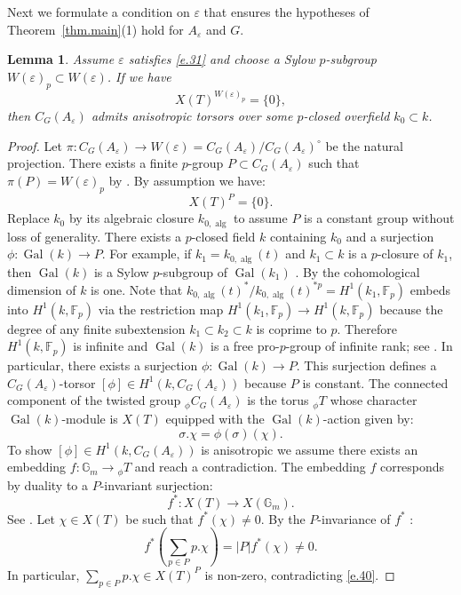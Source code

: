 \documentclass[12pt]{amsart}
\numberwithin{equation}{section}
\newtheorem{lemma}[theorem]{Lemma}
\theoremstyle{definition}
\newcommand{\bF}{\mathbb{F}}
\newcommand{\Gm}{\mathbb{G}_m}
\newcommand{\Gal}{\operatorname{Gal}}
\newcommand{\alg}{\operatorname{alg}}
\newcommand{\eps}{\varepsilon}
\begin{document}
Next we formulate a condition on $\eps$ that ensures the hypotheses of Theorem~\ref{thm.main}(1) hold for $A_\eps$ and $G$. 
\begin{lemma}\label{lem.C(Aeps)_admits_aniso}
    Assume $\eps$ satisfies \eqref{e.31} and choose a Sylow $p$-subgroup $W(\eps)_p\subset W(\eps)$. If we have \begin{equation}\label{e.32}
        X(T)^{W(\eps)_p} = \{0\},
        \end{equation} 
        then  $C_G(A_\eps)$ admits anisotropic torsors over some $p$-closed overfield $k_0\subset k$. 
\end{lemma}
\begin{proof}
    
Let $\pi: C_G(A_\eps) \to W(\eps) = C_G(A_\eps)/C_G(A_\eps)^\circ$ be the natural projection. There exists a finite  $p$-group $P\subset C_G(A_\eps)$ such that $\pi(P) = W(\eps)_p$ by \cite[Lemma 5.3]{lotscher2013essential2}. By assumption we have:
  \begin{equation}\label{e.40}
      X(T)^{P} = \{0\}.
  \end{equation}
    Replace $k_0$ by its algebraic closure $k_{0,\alg}$ to assume $P$ is a constant group without loss of generality.
  There exists a $p$-closed field $k$ containing $k_0$ and a surjection $\phi: \Gal(k) \to P$. For example, if $k_1 = k_{0,\alg}(t)$ and $k_1\subset k$ is a $p$-closure of $k_1$, then $\Gal(k)$ is a Sylow $p$-subgroup of $\Gal(k_1)$ \cite[Proposition
101.16]{ekm}. By \cite[Page 80, Example (b)]{serre1997galois} the cohomological dimension of $k$ is one. Note that $k_{0,\alg}(t)^*/k_{0,\alg}(t)^{*p}=H^1(k_1,\bF_p)$ embeds into $H^1(k,\bF_p)$ via the restriction map $H^1(k_1,\bF_p)\to H^1(k,\bF_p)$ because the degree of any finite subextension $k_1 \subset k_2 \subset k$ is coprime to $p$. Therefore $H^1(k,\bF_p)$ is infinite and $\Gal(k)$ is a free pro-$p$-group of infinite rank; see \cite[Page 30, Proposition 24]{serre1997galois}. In particular, there exists a surjection $\phi: \Gal(k) \to P$. This surjection defines a $C_G(A_\eps)$-torsor $[\phi]\in H^1(k,C_G(A_\eps))$ because $P$ is constant. The connected component of the twisted group ${}_\phi C_G(A_\eps)$ is the torus ${}_\phi T$ whose character $\Gal(k)$-module is $X(T)$ equipped with the $\Gal(k)$-action given by:
  $$\sigma. \chi = \phi(\sigma)(\chi).$$
  To show $[\phi]\in H^1(k,C_G(A_\eps))$ is anisotropic we assume there exists an embedding $f:\Gm\to {}_\phi T$ and reach a contradiction. The embedding $f$ corresponds by duality to a $P$-invariant surjection:
  $$f^*: X(T) \to X(\Gm).$$
  See \cite[Corollary 8.3]{borel1965groupes}.
  Let $\chi\in X(T)$ be such that $f^*(\chi)\neq 0$. By the $P$-invariance of $f^*$    :
  $$ f^*(\sum_{p\in P} p.\chi)= |P|f^*(\chi) \neq 0.$$
  In particular, $\sum_{p\in P} p.\chi \in X(T)^{P}$ is non-zero, contradicting \eqref{e.40}.
\end{proof}
\end{document}
